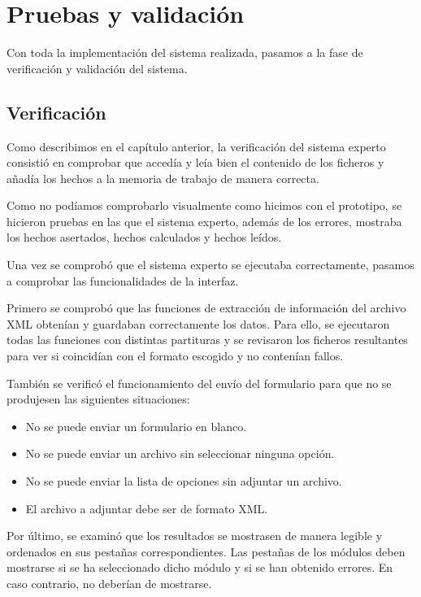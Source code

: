 \chapter{Pruebas y validación}

Con toda la implementación del sistema realizada, pasamos a la fase de verificación y validación del sistema. 

\section{Verificación}

Como describimos en el capítulo anterior, la verificación del sistema experto consistió en comprobar que accedía y leía bien el contenido de los ficheros y añadía los hechos a la memoria de trabajo de manera correcta. 

Como no podíamos comprobarlo visualmente como hicimos con el prototipo, se hicieron pruebas en las que el sistema experto, además de los errores, mostraba los hechos asertados, hechos calculados y hechos leídos. 

Una vez se comprobó que el sistema experto se ejecutaba correctamente, pasamos a comprobar las funcionalidades de la interfaz.

Primero se comprobó que las funciones de extracción de información del archivo XML obtenían y guardaban correctamente los datos. Para ello, se ejecutaron todas las funciones con distintas partituras y se revisaron los ficheros resultantes para ver si coincidían con el formato escogido y no contenían fallos.

También se verificó el funcionamiento del envío del formulario para que no se produjesen las siguientes situaciones:

\begin{itemize}

	\item No se puede enviar un formulario en blanco.
	\item No se puede enviar un archivo sin seleccionar ninguna opción.
	\item No se puede enviar la lista de opciones sin adjuntar un archivo.
	\item El archivo a adjuntar debe ser de formato XML.

\end{itemize}

Por último, se examinó que los resultados se mostrasen de manera legible y ordenados en sus pestañas correspondientes. Las pestañas de los módulos deben mostrarse si se ha seleccionado dicho módulo y si se han obtenido errores. En caso contrario, no deberían de mostrarse.

